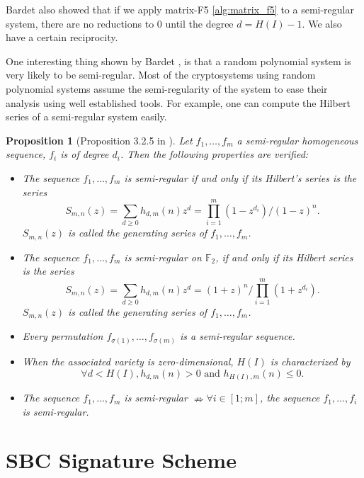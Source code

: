 \documentclass[english]{article}
\newtheorem{proposition}{Proposition}[section]
\begin{document}
		Bardet also showed that if we apply matrix-F5 \ref{alg:matrix_f5} to a semi-regular system, there are no reductions to 0 until the degree $d = H(I) - 1$. We also have a certain reciprocity.
		
		One interesting thing shown by Bardet \cite{Bardet04}, is that a random polynomial system is very likely to be semi-regular. Most of the cryptosystems using random polynomial systems assume the semi-regularity of the system to ease their analysis using well established tools. For example, one can compute the Hilbert series of a semi-regular system easily.
		
		\begin{proposition}[Proposition 3.2.5 in \cite{Bardet04}]\label{PropSemi}
			Let $f_1,\dots,f_m$ a semi-regular homogeneous sequence, $f_i$ is of degree $d_i$. Then the following properties are verified:
			\begin{itemize}
				\item The sequence $f_1,\dots,f_m$ is semi-regular if and only if its Hilbert's series is the series $$S_{m, n}(z) = \sum_{d \geq 0}h_{d, m}(n)z^d = \prod_{i=1}^{m}(1-z^{d_i})/(1-z)^n.$$ $S_{m, n}(z)$ is called the generating series of $f_1,\dots,f_m$.
				\item The sequence $f_1,\dots,f_m$ is semi-regular on $\mathbb{F}_2$, if and only if its Hilbert series is the series $$S_{m, n}(z) = \sum_{d \geq 0}h_{d, m}(n)z^d = (1+z)^n/\prod_{i=1}^{m}(1+z^{d_i}).$$ $S_{m, n}(z)$ is called the generating series of $f_1,\dots,f_m$.
				\item Every permutation $f_{\sigma(1)},\dots,f_{\sigma(m)}$ is a semi-regular sequence.
				\item When the associated variety is zero-dimensional, $H(I)$ is characterized by
				$$
				\forall d < H(I), h_{d, m}(n) > 0 \text{ and } h_{H(I), m}(n) \leq 0.
				$$
				\item The sequence $f_1,\dots,f_m$ is semi-regular $\nRightarrow \forall i \in [1;m]$, the sequence $f_1,\dots,f_i$ is semi-regular. 
			\end{itemize}
		\end{proposition}
		
	\section{SBC Signature Scheme}
\end{document}
